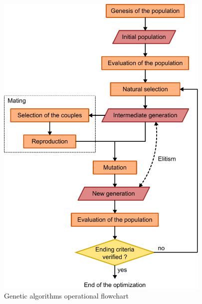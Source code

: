 \documentclass{ametsoc}
\begin{document}
\begin{figure}[htb]
	\centerline{\includegraphics[width=10.3cm]{figure_structure_gas.pdf}}
	\caption{Genetic algorithms operational flowchart}
	\label{figure_structure_gas}
\end{figure}
\end{document}
